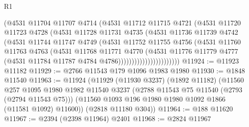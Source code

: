 \begin{lexlean}{R1}
\begin{coremodule}
                            (@4531
                              @11704
                              @11707
                              @4714
                              (@4531
                                @11712
                                @11715
                                @4721
                                (@4531
                                  @11720
                                  @11723
                                  @4728
                                  (@4531
                                    @11728
                                    @11731
                                    @4735
                                    (@4531
                                      @11736
                                      @11739
                                      @4742
                                      (@4531
                                        @11744
                                        @11747
                                        @4749
                                        (@4531
                                          @11752
                                          @11755
                                          @4756
                                          (@4531
                                            @11760
                                            @11763
                                            @4763
                                            (@4531
                                              @11768
                                              @11771
                                              @4770
                                              (@4531
                                                @11776
                                                @11779
                                                @4777
                                                (@4531
                                                  @11784
                                                  @11787
                                                  @4784
                                                  @4786)))))))))))))))))))))))
@11924 := @11923 @11182
@11929 := @2766 @11543 @179 @1096 @1983 @1980
@11930 := @1848 @11540
@11963 := @11924
    (@11929
      (@11930 @3237)
      (@1892 @11182)
      (@11560
        @257
        @1095
        @1980
        @1982
        @11540
        @3237
        (@2788 @11543 @75 @11540 (@2793 (@2794 @11543 @75)))
        (@11560 @1093 @196 @1980 @1980 @1092 @1866 (@11581 @1092) @11600))
      (@2818 @11180 @304))
@11964 := @188 @11620
@11967 := @2394 (@2398 @11964) @2401
@11968 := @2824 @11967

\end{coremodule}
\end{lexlean}
